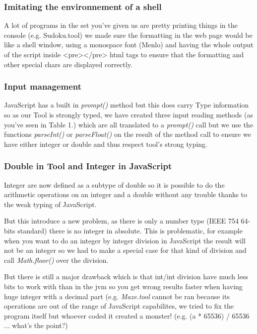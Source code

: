 \subsubsection{Imitating the environnement of a shell}
A lot of programs in the set you've given us are pretty printing things in the console
(e.g. Sudoku.tool) we made sure the formatting in the web page would be like a shell window,
using a monospace font (Menlo) and having the whole output of the script inside <pre></pre> html tags to ensure that the formatting and other special chars are displayed correctly.
\subsubsection{Input management}
JavaScript has a built in \emph{prompt()} method but this does carry Type information so as our Tool is strongly typed, we have created three input reading methods (as you've seen in Table 1.) which are all translated to a \emph{prompt()} call but we use the functions \emph{parseInt()} or \emph{parseFloat()} on the result of the method call to ensure we have either integer or double and thus respect tool's strong typing.


\subsubsection{Double in Tool and Integer in JavaScript}
Integer are now defined as a subtype of double so it is possible to do the arithmetic operations on an integer and a double without any trouble thanks to the weak typing of JavaScript.

But this introduce a new problem, as there is only a number type (IEEE 754 64-bits standard) there is no integer in absolute. This is problematic, for example when you want to do an integer by integer division
in JavaScript the result will not be an integer so we had to make a special case for that kind of division and call \emph{Math.floor()} over the division.

But there is still a major drawback which is that int/int division have much less bits to work with than
in the jvm so you get wrong results faster when having huge integer with a decimal part (e.g. \emph{Maze.tool} cannot be ran because its operations are out of the range of JavaScript capabilites, we tried to fix the program itself but whoever coded it created a monster! (e.g. (a * 65536) / 65536 ... what's the point?)  

